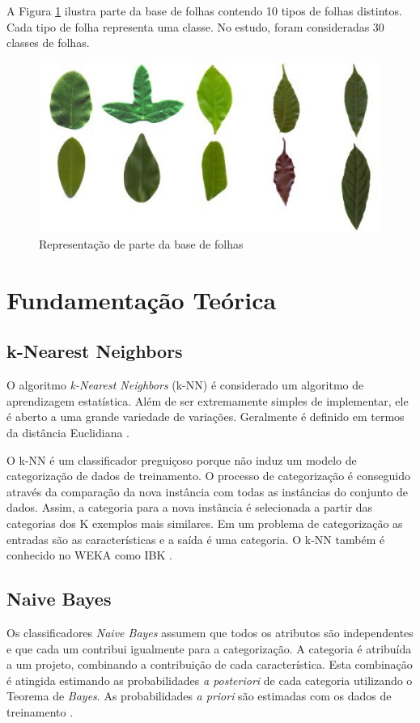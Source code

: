 \documentclass[conference]{IEEEtran}
\begin{document}
A Figura \ref{figura:base_folhas} ilustra parte da base de folhas contendo 10 tipos de folhas distintos. Cada tipo de folha representa uma classe. No estudo, foram consideradas 30 classes de folhas.

\begin{figure}[ht]
\centering
\includegraphics[scale=0.8]{base_folhas.jpg}
\caption{Representação de parte da base de folhas}
\label{figura:base_folhas}
\end{figure}

\section{Fundamentação Teórica}

\subsection{k-Nearest Neighbors}

O algoritmo \textit{k-Nearest Neighbors} (k-NN) é considerado um algoritmo de aprendizagem estatística. Além de ser extremamente simples de implementar, ele é aberto a uma grande variedade de variações. Geralmente é definido em termos da distância Euclidiana \cite{IEEEhowto:fauzi}.

O k-NN é um classificador preguiçoso porque não induz um modelo de categorização de dados de treinamento. O processo de categorização é conseguido através da comparação da nova instância com todas as instâncias do conjunto de dados. Assim, a categoria para a nova instância é selecionada a partir das categorias dos K exemplos mais similares. Em um problema de categorização as entradas são as características e a saída é uma categoria. O k-NN também é conhecido no WEKA como IBK \cite{IEEEhowto:linares}.

\subsection{Naive Bayes}
Os classificadores {\it Naive Bayes} assumem que todos os atributos são independentes e que cada um contribui igualmente para a categorização. A categoria é atribuída a um projeto, combinando a contribuição de cada característica. Esta combinação é atingida estimando as probabilidades {\it a posteriori} de cada categoria utilizando o Teorema de {\it Bayes}. As probabilidades {\it a priori} são estimadas com os dados de treinamento \cite{IEEEhowto:linares}. 
\end{document}
